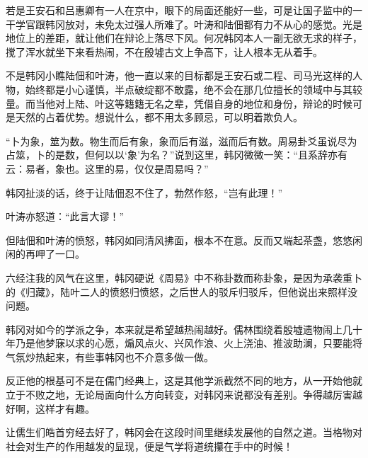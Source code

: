 若是王安石和吕惠卿有一人在京中，眼下的局面还能好一些，可是让国子监中的一干学官跟韩冈放对，未免太过强人所难了。叶涛和陆佃都有力不从心的感觉。光是地位上的差距，就让他们在辩论上落尽下风。何况韩冈本人一副无欲无求的样子，搅了浑水就坐下来看热闹，不在殷墟古文上争高下，让人根本无从着手。

不是韩冈小瞧陆佃和叶涛，他一直以来的目标都是王安石或二程、司马光这样的人物，始终都是小心谨慎，半点破绽都不敢露，绝不会在那几位擅长的领域中与其较量。而当他对上陆、叶这等籍籍无名之辈，凭借自身的地位和身份，辩论的时候可是天然的占着优势。想说什么，都不用太多顾忌，可以明着欺负人。

“卜为象，筮为数。物生而后有象，象而后有滋，滋而后有数。周易卦爻虽说尽为占筮，卜的是数，但何以以‘象’为名？”说到这里，韩冈微微一笑：“且系辞亦有云：易者，象也。这里的易，仅仅是周易吗？”

韩冈扯淡的话，终于让陆佃忍不住了，勃然作怒，“岂有此理！”

叶涛亦怒道：“此言大谬！”

但陆佃和叶涛的愤怒，韩冈如同清风拂面，根本不在意。反而又端起茶盏，悠悠闲闲的再呷了一口。

六经注我的风气在这里，韩冈硬说《周易》中不称卦数而称卦象，是因为承袭重卜的《归藏》，陆叶二人的愤怒归愤怒，之后世人的驳斥归驳斥，但他说出来照样没问题。

韩冈对如今的学派之争，本来就是希望越热闹越好。儒林围绕着殷墟遗物闹上几十年乃是他梦寐以求的心愿，煽风点火、兴风作浪、火上浇油、推波助澜，只要能将气氛炒热起来，有些事韩冈也不介意多做一做。

反正他的根基可不是在儒门经典上，这是其他学派截然不同的地方，从一开始他就立于不败之地，无论局面向什么方向转变，对韩冈来说都没有差别。争得越厉害越好啊，这样才有趣。

让儒生们皓首穷经去好了，韩冈会在这段时间里继续发展他的自然之道。当格物对社会对生产的作用越发的显现，便是气学将道统攥在手中的时候！


